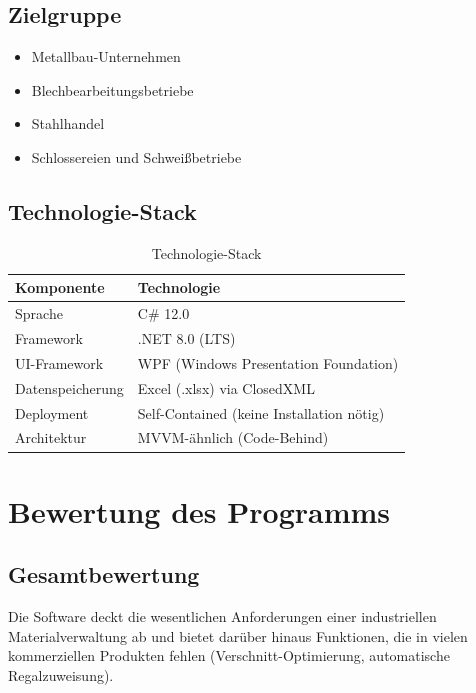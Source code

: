 \documentclass[a4paper,12pt]{article}
\begin{document}
\subsection{Zielgruppe}
\begin{itemize}
    \item Metallbau-Unternehmen
    \item Blechbearbeitungsbetriebe
    \item Stahlhandel
    \item Schlossereien und Schweißbetriebe
\end{itemize}

\subsection{Technologie-Stack}

\begin{table}[h]
\centering
\begin{tabularx}{\textwidth}{l X}
\toprule
\textbf{Komponente} & \textbf{Technologie} \\
\midrule
Sprache & C\# 12.0 \\
Framework & .NET 8.0 (LTS) \\
UI-Framework & WPF (Windows Presentation Foundation) \\
Datenspeicherung & Excel (.xlsx) via ClosedXML \\
Deployment & Self-Contained (keine Installation nötig) \\
Architektur & MVVM-ähnlich (Code-Behind) \\
\bottomrule
\end{tabularx}
\caption{Technologie-Stack}
\end{table}

\section{Bewertung des Programms}

\subsection{Gesamtbewertung}

\begin{successbox}
Die Software deckt die wesentlichen Anforderungen einer industriellen Materialverwaltung ab und bietet darüber hinaus Funktionen, die in vielen kommerziellen Produkten fehlen (Verschnitt-Optimierung, automatische Regalzuweisung).
\end{successbox}
\end{document}
